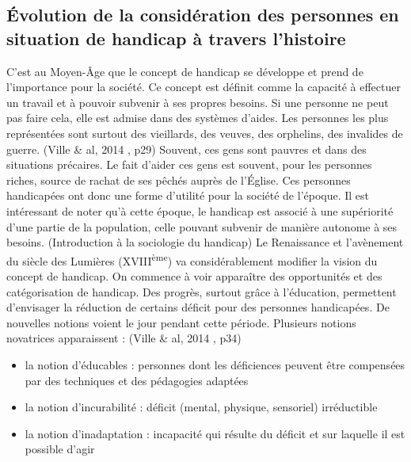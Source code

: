 \subsection{Évolution de la considération des personnes en situation de handicap à travers l'histoire}


C'est au Moyen-Âge que le concept de handicap se développe et prend de l'importance pour la société. Ce concept est définit comme la capacité à effectuer un travail et à pouvoir subvenir à ses propres besoins. Si une personne ne peut pas faire cela, elle est admise dans des systèmes d’aides. Les personnes les plus représentées sont surtout des vieillards, des veuves, des orphelins, des invalides de guerre. (Ville \& al, 2014 \cite{Ville2014}, p29) Souvent, ces gens sont pauvres et dans des situations précaires. Le fait d’aider ces gens est souvent, pour les personnes riches, source de rachat de ses pêchés auprès de l’Église. Ces personnes handicapées ont donc une forme d’utilité pour la société de l'époque. Il est intéressant de noter qu'à cette époque, le handicap est associé à une supériorité d'une partie de la population, celle pouvant subvenir de manière autonome à ses besoins. (Introduction à la sociologie du handicap)
Le Renaissance et l'avènement du siècle des Lumières (XVIII\textsuperscript{ème}) va considérablement modifier la vision du concept de handicap. On commence à voir apparaître des opportunités et des catégorisation de handicap. Des progrès, surtout grâce à l’éducation, permettent d’envisager la réduction de certains déficit pour des personnes handicapées. De nouvelles notions voient le jour pendant cette période. Plusieurs notions novatrices apparaissent : (Ville \& al, 2014 \cite{Ville2014}, p34)
\begin{itemize}
\item la notion \og d'éducables \fg : personnes dont les déficiences peuvent être compensées par des techniques et des pédagogies adaptées
\item la notion \og d'incurabilité \fg : déficit (mental, physique, sensoriel) irréductible
\item la notion \og d'inadaptation \fg : incapacité qui résulte du déficit et sur laquelle il est possible d’agir
\end{itemize}

